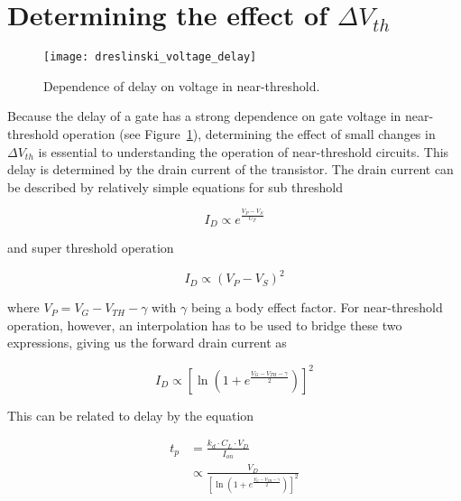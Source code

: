 \section{Determining the effect of $\Delta V_{th}$}
\label{sec:deltavth}

\begin{figure}[thpb]
    \centering
    \texttt{[image: dreslinski\_voltage\_delay]}
    \caption{Dependence of delay on voltage in near-threshold.~\cite{Dreslinski:2010ez}}
    \label{fig:voltage_delay}
\end{figure}
Because the delay of a gate has a strong dependence on gate voltage in near-threshold operation (see Figure~\ref{fig:voltage_delay}), determining the effect of small changes in $\Delta V_{th}$ is essential to understanding the operation of near-threshold circuits.
This delay is determined by the drain current of the transistor.
The drain current can be described by relatively simple equations for sub threshold \cite{Enz:1995vs} 

\begin{equation}
I_D \propto e^\frac{V_P-V_S}{U_T}
\end{equation}

and super threshold operation

\begin{equation}
I_D \propto (V_P-V_S)^2
\end{equation}

where $V_P=V_G-V_{TH}-\gamma$ with $\gamma$ being a body effect factor. 
For near-threshold operation, however, an interpolation has to be used to bridge these two expressions\cite{Enz:1995vs}, giving us the forward drain current as

\begin{equation}
I_D \propto \left[\ln\left(1+e^\frac{V_G-V_{TH}-\gamma}{2}\right)\right]^2
\end{equation}

This can be related to delay by the equation \cite{Hanson:2007uu}

\begin{align}
t_p &= \frac{k_d\cdot C_L\cdot V_D}{I_{on}}\\
&\propto\frac{V_D}{\left[\ln\left(1+e^\frac{V_G-V_{TH}-\gamma}{2}\right)\right]^2}
\end{align}
 
 
